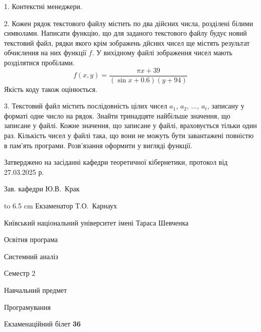 \documentclass[12pt, ukrainian]{article}
\begin{document}
{%
1. Контекстні менеджери.%
\par
\vspace{2mm}

2. Кожен рядок текстового файлу містить по два дійсних числа, розділені білими символами.
Написати функцію, що для заданого текстового файлу будує новий текстовий файл, рядки якого крім зображень дйсних чисел ще містять результат обчислення на них функції $f$. У вихідному файлі зображення чисел мають розділятися пробілами. 
$$f(x, y) =\frac{\pi x + 39}{(\sin x + 0.6) (y + 94)}$$ 
Якість коду також оцінюється.

\par
\vspace{2mm}

3. Текстовий файл містить послідовність цілих чисел $a_1$, $a_2$, $\ldots$, $a_t$, записану у форматі одне число на рядок. Знайти тринадцяте найбільше значення, що записане у файлі. Кожне значення, що записане у файлі, враховується тільки один раз. Кількість чисел у файлі така, що вони не можуть бути завантажені повністю в пам'ять програми. Розв'язання оформити у вигляді функції.

}
{\smallskip\smallskip \begin {scriptsize} Затверджено на засіданні кафедри теоретичної кібернетики, протокол   від   27.03.2025 р.\par\smallskip\smallskip\smallskip\smallskip
{\parbox {6.5 cm} {Зав. кафедри \dotfill Ю.В.~Крак}}\hspace {0.7cm} {\hbox to 6.5 cm { Екзаменатор \dotfill Т.О.~Карнаух}} \end{scriptsize}}
\vspace{2.9cm}
{{\begin {scriptsize}\par
{ \center  Київський національний університет імені Тараса Шевченка \par}
{\parbox {5 cm}{Освітня програма \hfill}{\parbox {7 cm}{Системний аналіз\hfill}}\parbox {6 cm}{\hfill Семестр 2}}\par
{\parbox {5 cm} {Навчальний предмет \hfill}\parbox {7 cm}{Програмування \hfill}\parbox {6cm}{\hfill}\par}\vspace{-15pt} \end{scriptsize}}{\center Екзаменаційний білет \No \textbf { 36 }\par}}
\end{document}
